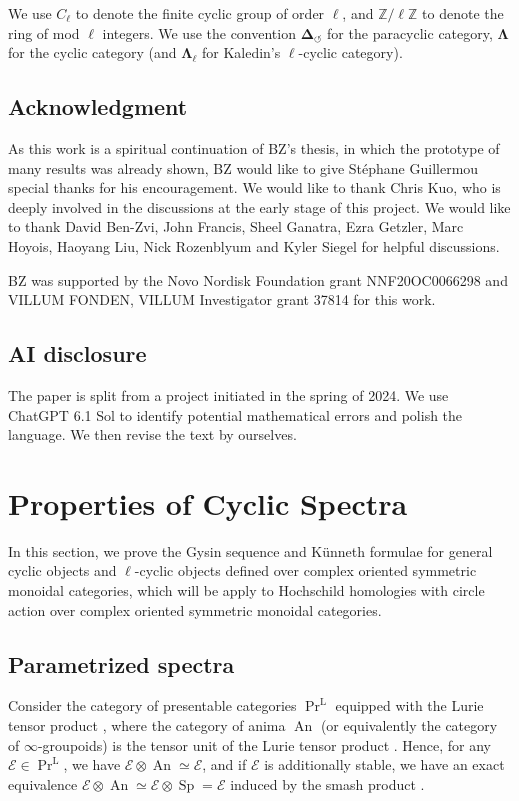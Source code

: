 \documentclass[11pt]{amsart}
\numberwithin{equation}{section}
\theoremstyle{plain}
\theoremstyle{definition}
\theoremstyle{remark}
\newcommand{\bZ} { {\mathbb{Z}}}
\newcommand{\cE} { {\mathcal{E}}}
\newcommand\PrL{  {  \operatorname{Pr}^{\operatorname{L} }  } }
\newcommand\Sp{ {\operatorname{Sp} } }
\newcommand\An{ {\operatorname{An} } }
\begin{document}
We use $C_\ell$ to denote the finite cyclic group of order $\ell$, and $\bZ/\ell\bZ$ to denote the ring of mod $\ell$ integers. We use the convention $\boldsymbol{\Delta}_{\circlearrowleft}$ for the paracyclic category, $\boldsymbol{\Lambda}$ for the cyclic category (and $\boldsymbol{\Lambda}_\ell$ for Kaledin's $\ell$-cyclic category). 


\subsection*{Acknowledgment}As this work is a spiritual continuation of BZ's thesis, in which the prototype of many results was already shown, BZ would like to give Stéphane Guillermou special thanks for his encouragement. We would like to thank Chris Kuo, who is deeply involved in the discussions at the early stage of this project. We would like to thank David Ben-Zvi, John Francis, Sheel Ganatra, Ezra Getzler, Marc Hoyois, Haoyang Liu, Nick Rozenblyum and Kyler Siegel for helpful discussions. 

BZ was supported by the Novo Nordisk Foundation grant NNF20OC0066298 and VILLUM FONDEN, VILLUM Investigator grant 37814 for this work.


\subsection*{AI disclosure}The paper is split from a project initiated in the spring of 2024. We use ChatGPT 6.1 Sol to identify potential mathematical errors and polish the language. We then revise the text by ourselves.


\section{Properties of Cyclic Spectra}\label{sec:gysin}
In this section, we prove the Gysin sequence and K\"unneth formulae for general cyclic objects and $\ell$-cyclic objects defined over complex oriented symmetric monoidal categories, which will be apply to Hochschild homologies with circle action over complex oriented symmetric monoidal categories. 

\subsection{Parametrized spectra}
Consider the category of presentable categories $\PrL$ equipped with the Lurie tensor product \cite[Section 5.3.6]{HTT} \cite[Section 4.8.1]{HA}, where the category of anima $\An$ (or equivalently the category of $\infty$-groupoids) is the tensor unit of the Lurie tensor product \cite[Example 4.8.1.20]{HA}. Hence, for any $\cE \in \PrL$, we have $\cE \otimes \An\simeq \cE$, and if $\cE$ is additionally stable, we have an exact equivalence $\cE \otimes \An\simeq \cE \otimes \Sp = \cE$ induced by the smash product \cite[Corollary 1.4.2.27 \& Example 4.8.1.23]{HA}.
\end{document}

